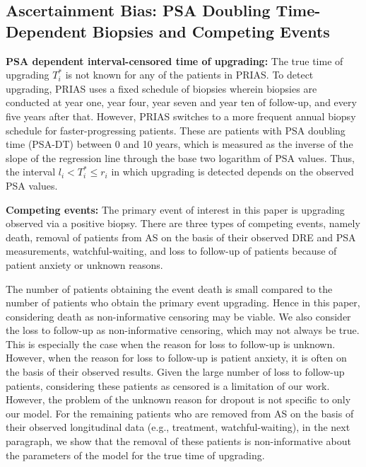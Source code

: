 \begin{subappendices}
\section{Ascertainment Bias: PSA Doubling Time-Dependent Biopsies and Competing Events}
\label{c2:appendix:B}
\textbf{PSA dependent interval-censored time of upgrading:} The true time of upgrading $T^*_i$ is not known for any of the patients in PRIAS. To detect upgrading, PRIAS uses a fixed schedule of biopsies wherein biopsies are conducted at year one, year four, year seven and year ten of follow-up, and every five years after that. However, PRIAS switches to a more frequent annual biopsy schedule for faster-progressing patients. These are patients with PSA doubling time (PSA-DT) between 0 and 10 years, which is measured as the inverse of the slope of the regression line through the base two logarithm of PSA values. Thus, the interval $l_i < T_i^* \leq r_i$ in which upgrading is detected depends on the observed PSA values. 

\textbf{Competing events:} The primary event of interest in this paper is upgrading observed via a positive biopsy. There are three types of competing events, namely death, removal of patients from AS on the basis of their observed DRE and PSA measurements, watchful-waiting, and loss to follow-up of patients because of patient anxiety or unknown reasons.

The number of patients obtaining the event death is small compared to the number of patients who obtain the primary event upgrading. Hence in this paper, considering death as non-informative censoring may be viable. We also consider the loss to follow-up as non-informative censoring, which may not always be true. This is especially the case when the reason for loss to follow-up is unknown. However, when the reason for loss to follow-up is patient anxiety, it is often on the basis of their observed results. Given the large number of loss to follow-up patients, considering these patients as censored is a limitation of our work. However, the problem of the unknown reason for dropout is not specific to only our model. For the remaining patients who are removed from AS on the basis of their observed longitudinal data (e.g., treatment, watchful-waiting), in the next paragraph, we show that the removal of these patients is non-informative about the parameters of the model for the true time of upgrading.


\end{subappendices}
